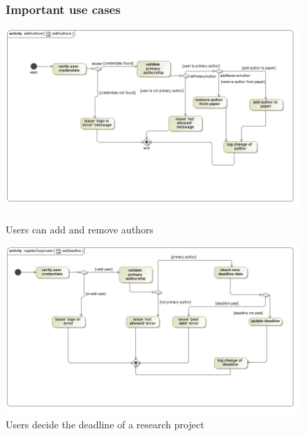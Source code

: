 \documentclass[a4paper,12pt]{report}
\begin{document}
\begin{figure}[ht]
\subsubsection{Important use cases}
\includegraphics[scale=0.5]{act__editAuthors__editAuthors.jpg} 
\caption{Users can add and remove authors}


\includegraphics[scale=0.5]{setDeadline.jpg} 
\caption{Users decide the deadline of a research project}
\end{figure}
\newpage
\end{document}
